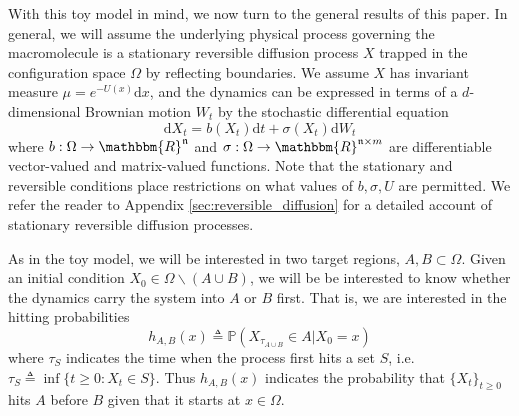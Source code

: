 \documentclass[english, aip, jcp, priprint, graphicx,floatfix]{revtex4-1}
\theoremstyle{plain}
\theoremstyle{definition}
\theoremstyle{plain}
\begin{document}
With this toy model in mind, we now turn to the general results of this paper. In general, we will assume the underlying physical process governing the macromolecule is a stationary reversible diffusion process $X$ trapped in the configuration space $\Omega$ by reflecting boundaries.  We assume $X$ has invariant
measure ${\mu}= e^{- U (x)} \mathrm{d} x$, and the dynamics can be expressed in terms of a $d$-dimensional Brownian motion $W_t$ by the stochastic differential equation
\begin{equation}\label{equ:general_sde}\mathrm{d} X_t = b (X_t) \mathrm{d} t + \sigma (X_t) \mathrm{d} W_t \end{equation}
where $b: \Omega \rightarrow \mathbbm{R}^\dimension$ and $\sigma :
\Omega \rightarrow \mathbbm{R}^{\dimension \times m}$ are differentiable vector-valued
and matrix-valued functions.  Note that the stationary and reversible conditions place restrictions on what values of $b,\sigma,U$ are permitted.  We refer the reader to Appendix \ref{sec:reversible_diffusion} for a detailed account of stationary reversible diffusion processes.

As in the toy model, we will be interested in two target regions, $A,B\subset \Omega$.  Given an initial condition $X_0\in \Omega \backslash (A\cup B)$, we will be be interested to know whether the dynamics carry the system into $A$ or $B$ first.  That is, we are interested in the hitting probabilities
\[ h_{A, B}(x) \triangleq \mathbb{P}(X_{\tau_{A\cup B}}\in A|X_0=x)\]
where $\tau_S$ indicates the time when the process first hits a set $S$, i.e. $\tau_S \triangleq \inf \{ t \geqslant 0 : X_t \in S \}$.  Thus $h_{A,B}(x)$ indicates the probability that $\{X_t\}_{t \geq 0}$ hits $A$ before $B$ given that it starts at $x\in\Omega$. 
\end{document}
